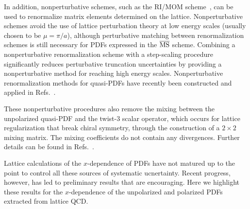 \begin{itemize}
In addition, nonperturbative schemes, such as the 
RI/MOM scheme~\cite{Martinelli:1994ty}, 
can be used to renormalize matrix elements determined on the lattice. 
%
Nonperturbative schemes avoid the use of lattice perturbation theory at 
low energy scales (usually chosen to be $\mu = \pi/a$), although perturbative 
matching between renormalization schemes is still necessary for PDFs expressed 
in the $\overline{\rm MS}$ scheme. 
%
Combining a nonperturbative renormalization scheme with a step-scaling 
procedure~\cite{Luscher:1991wu} significantly reduces perturbative truncation 
uncertainties by providing a nonperturbative method for reaching high energy 
scales.
% 
Nonperturbative renormalization methods for quasi-PDFs have recently been 
constructed and applied in 
Refs.~\cite{Alexandrou:2017huk,Chen:2017mzz,Green:2017xeu}.

These nonperturbative procedures also remove the mixing between the unpolarized 
quasi-PDF and the twist-3 scalar operator, which occurs for lattice 
regularization that break chiral symmetry, through the construction 
of a $2\times2$ mixing matrix. 
%
The mixing coefficients do not contain any divergences. 
%
Further details can be found in Refs.~\cite{Alexandrou:2017huk,Chen:2017mzz}. 
\end{itemize}

Lattice calculations of the $x$-dependence of PDFs have not matured 
up to the point to control all these sources of systematic ucnertainty.       
%
Recent progress, however, has led to preliminary results that are encouraging. 
%
Here we highlight these results for the $x$-dependence
of the unpolarized and polarized PDFs extracted from lattice QCD. 

